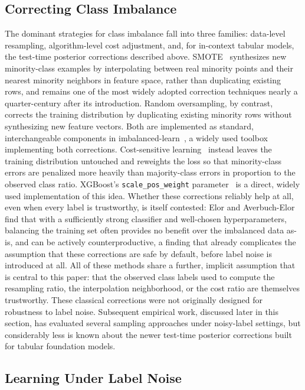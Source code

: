 \subsection{Correcting Class Imbalance}

The dominant strategies for class imbalance fall into three families:
data-level resampling, algorithm-level cost adjustment, and, for
in-context tabular models, the test-time posterior corrections described
above. SMOTE~\cite{chawla2002smote} synthesizes new minority-class examples by
interpolating between real minority points and their nearest minority
neighbors in feature space, rather than duplicating existing rows, and remains
one of the most widely adopted correction techniques nearly a quarter-century
after its introduction. Random oversampling, by contrast, corrects the
training distribution by duplicating existing minority rows without
synthesizing new feature vectors. Both are implemented as standard,
interchangeable components in imbalanced-learn~\cite{lemaitre2017imbalancedlearn},
a widely used toolbox implementing both corrections. Cost-sensitive
learning~\cite{elkan2001costsensitive} instead leaves the training
distribution untouched and reweights the loss so that minority-class errors
are penalized more heavily than majority-class errors in proportion to the
observed class ratio. XGBoost's \texttt{scale\_pos\_weight}
parameter~\cite{chen2016xgboost} is a direct, widely used implementation of
this idea. Whether these
corrections reliably help at all, even when every label is trustworthy, is
itself contested: Elor and Averbuch-Elor~\cite{elor2022smote} find that with
a sufficiently strong classifier and well-chosen hyperparameters, balancing
the training set often provides no benefit over the imbalanced data as-is,
and can be actively counterproductive, a finding that already complicates
the assumption that these corrections are safe by default, before label
noise is introduced at all. All of these methods share a further, implicit
assumption that is central to this paper: that the
observed class labels used to compute the resampling ratio, the interpolation
neighborhood, or the cost ratio are themselves trustworthy. These classical corrections were not originally designed for robustness
to label noise. Subsequent empirical work, discussed later in this
section, has evaluated several sampling approaches under noisy-label
settings, but considerably less is known about the newer test-time
posterior corrections built for tabular foundation models.

\subsection{Learning Under Label Noise}

